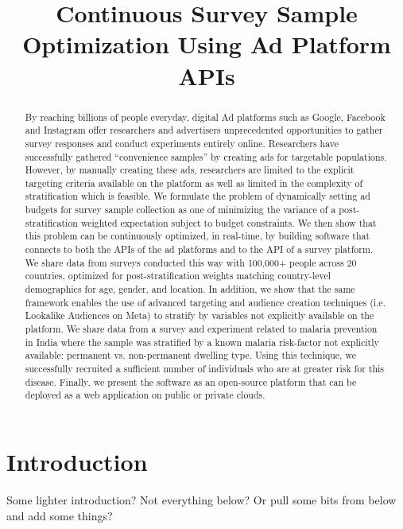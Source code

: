 \message{ !name(survey-sampling-with-ads.tex)}\documentclass[a4paper,12pt]{article}
\title{Continuous Survey Sample Optimization Using Ad Platform APIs}
\theoremstyle{proposition}
\begin{document}

\maketitle

\begin{abstract}
By reaching billions of people everyday, digital Ad platforms such as Google, Facebook and Instagram offer researchers and advertisers unprecedented opportunities to gather survey responses and conduct experiments entirely online. Researchers have successfully gathered “convenience samples” by creating ads for targetable populations. However, by manually creating these ads, researchers are limited to the explicit targeting criteria available on the platform as well as limited in the complexity of stratification which is feasible. We formulate the problem of dynamically setting ad budgets for survey sample collection as one of minimizing the variance of a post-stratification weighted expectation subject to budget constraints. We then show that this problem can be continuously optimized, in real-time, by building software that connects to both the APIs of the ad platforms and to the API of a survey platform. We share data from surveys conducted this way with 100,000+ people across 20 countries, optimized for post-stratification weights matching country-level demographics for age, gender, and location. In addition, we show that the same framework enables the use of advanced targeting and audience creation techniques (i.e. Lookalike Audiences on Meta) to stratify by variables not explicitly available on the platform. We share data from a survey and experiment related to malaria prevention in India where the sample was stratified by a known malaria risk-factor not explicitly available: permanent vs. non-permanent dwelling type. Using this technique, we successfully recruited a sufficient number of individuals who are at greater risk for this disease. Finally, we present the software as an open-source platform that can be deployed as a web application on public or private clouds.
\end{abstract}

\clearpage

\section{Introduction}

Some lighter introduction? Not everything below? Or pull some bits from below and add some things?
\end{document}
